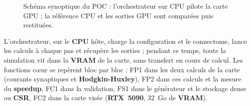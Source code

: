 \begin{figure}[H]
{}%
\caption{Schéma synoptique du POC : l'orchestrateur sur CPU pilote la carte GPU ; la référence CPU et les sorties GPU sont comparées puis restituées.}
\label{fig:syno}
\end{figure}

L'orchestrateur, sur le \textbf{CPU} hôte, charge la configuration et le connectome, lance les calculs à chaque pas et récupère les sorties ; pendant ce temps, toute la simulation vit dans la \textbf{VRAM} de la carte, sans transfert en cours de calcul. Les fonctions cœur se repèrent bloc par bloc : FP1 dans les deux calculs de la carte (courants synaptiques et \textbf{Hodgkin-Huxley}), FP2 dans ces calculs et la mesure du \textbf{speedup}, FC1 dans la validation, FS1 dans le générateur et le stockage dense ou \textbf{CSR}, FC2 dans la carte visée (\textbf{RTX~5090}, 32~Go de \textbf{VRAM}).

